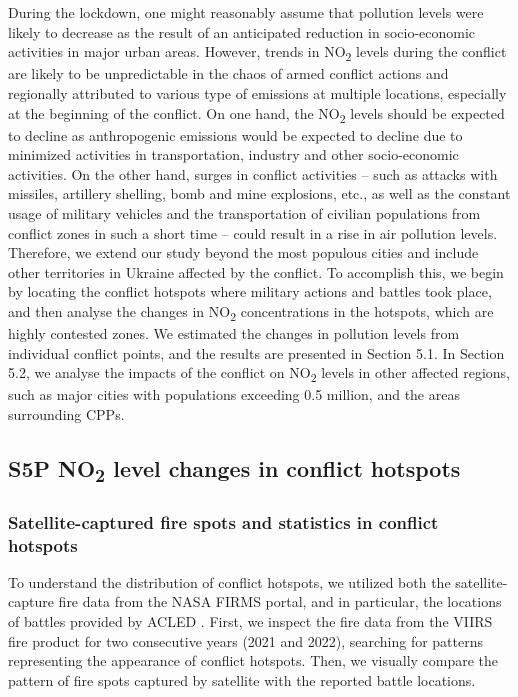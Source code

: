 During the lockdown, one might reasonably assume that pollution levels were likely to decrease as the result of an anticipated reduction in socio-economic activities in major urban areas. However, trends in NO\textsubscript{2} levels during the conflict are likely to be unpredictable in the chaos of armed conflict actions and regionally attributed to various type of emissions at multiple locations, especially at the beginning of the conflict. On one hand, the NO\textsubscript{2} levels should be expected to decline as anthropogenic emissions would be expected to decline due to minimized activities in transportation, industry and other socio-economic activities. On the other hand, surges in conflict activities – such as attacks with missiles, artillery shelling, bomb and mine explosions, etc., as well as the constant usage of military vehicles and the transportation of civilian populations from conflict zones in such a short time – could result in a rise in air pollution levels. Therefore, we extend our study beyond the most populous cities and include other territories in Ukraine affected by the conflict. To accomplish this, we begin by locating the conflict hotspots where military actions and battles took place, and then analyse the changes in NO\textsubscript{2} concentrations in the hotspots, which are highly contested zones. We estimated the changes in pollution levels from individual conflict points, and the results are presented in Section 5.1. In Section 5.2, we analyse the impacts of the conflict on NO\textsubscript{2} levels in other affected regions, such as major cities with populations exceeding 0.5 million, and the areas surrounding CPPs.\par
\subsection{S5P NO\textsubscript{2} level changes in conflict hotspots}
\subsubsection*{Satellite-captured fire spots and statistics in conflict hotspots}
To understand the distribution of conflict hotspots, we utilized both the satellite-capture fire data from the NASA FIRMS portal, and in particular, the locations of battles provided by ACLED \citep{raleigh2010introducing}. First, we inspect the fire data from the VIIRS fire product for two consecutive years (2021 and 2022), searching for patterns representing the appearance of conflict hotspots. Then, we visually compare the pattern of fire spots captured by satellite with the reported battle locations.\par

